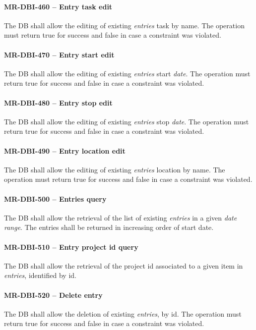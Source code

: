 \paragraph{MR-DBI-460 -- Entry task edit}
The \gls{DB} shall allow the editing of existing \emph{entries} task
by name.
The operation must return true for success and false in case a
constraint was violated.

\paragraph{MR-DBI-470 -- Entry start edit}
The \gls{DB} shall allow the editing of existing \emph{entries} start
\emph{date}.
The operation must return true for success and false in case a
constraint was violated.

\paragraph{MR-DBI-480 -- Entry stop edit}
The \gls{DB} shall allow the editing of existing \emph{entries} stop
\emph{date}.
The operation must return true for success and false in case a
constraint was violated.

\paragraph{MR-DBI-490 -- Entry location edit}
The \gls{DB} shall allow the editing of existing \emph{entries} location
by name.
The operation must return true for success and false in case a
constraint was violated.

\paragraph{MR-DBI-500 -- Entries query}
The \gls{DB} shall allow the retrieval of the list of existing \emph{entries}
in a given \emph{date range}. The entries shall be returned in
increasing order of start date.

\paragraph{MR-DBI-510 -- Entry project id query}
The \gls{DB} shall allow the retrieval of the project id associated to
a given item in \emph{entries}, identified by id.

\paragraph{MR-DBI-520 -- Delete entry}
The \gls{DB} shall allow the deletion of existing \emph{entries}, by id.
The operation must return true for success and false in case a
constraint was violated.

